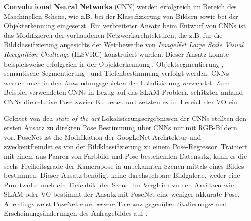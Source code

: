 \textbf{Convolutional Neural Networks} (CNN) werden erfolgreich im Bereich des Maschinellen Sehens, wie z.B. bei der Klassifizierung von Bildern \cite{krizhevskyImageNetClassificationDeep2012} sowie bei der Objekterkennung \cite{girshickRichFeatureHierarchies2014} eingesetzt. 
Ein verbreiteter Ansatz beim Entwurf von CNNs ist das Modifizieren der vorhandenen Netzwerkarchitekturen, die z.B. für die Bildklassifizierung angesichts der Wettbewerbe von \textit{ImageNet Large Scale Visual Recognition Challenge} (ILSVRC) \cite{russakovskyImageNetLargeScale2015} konstruiert wurden. Dieser Ansatz konnte beispielsweise erfolgreich in der Objekterkennung \cite{girshickFastRCNN2015a}, Objektsegmentierung \cite{kokkinosPushingBoundariesBoundary2015}, semantische Segmentierung \cite{ hazirbasFuseNetIncorporatingDepth2017} und Tiefenbestimmung \cite{boliDepthSurfaceNormal2015} verfolgt werden. CNNs werden auch in den Anwendungsgebieten der Lokalisierung verwendet. Zum Beispiel verwendeten \citet{parisottoGlobalPoseEstimation2018} CNNs in Bezug auf das SLAM Problem. \citet{melekhovRelativeCameraPose2017} schätzten anhand CNNs die relative Pose zweier Kameras. \citet{costanteExploringRepresentationLearning2016} und \citet{wangDeepVOEndtoendVisual2017} setzten es im Bereich der VO ein.

Geleitet von den \textit{state-of-the-art} Lokalisierungsergebnissen der CNNs stellten \citet{kendallPoseNetConvolutionalNetwork2015} den ersten Ansatz zu direkten Pose Bestimmung über CNNs nur mit RGB-Bildern vor. PoseNet ist die Modifikation der GoogLeNet Architektur \cite{szegedyGoingDeeperConvolutions2015} und zweckentfremdet es von der Bildklassifizierung zu einem Pose-Regressor. Trainiert mit einem aus Paaren von Farbbild und Pose bestehenden Datensatz, kann es die sechs Freiheitsgrade der Kamerapose in unbekannten Szenen mittels eines Bildes bestimmen. Dieser Ansatz benötigt keine durchsuchbare Bildgalerie, weder eine Punktwolke noch ein Tiefenbild der Szene. Im Vergleich zu den Ansätzen wie SLAM oder VO bestimmt der Ansatz mit PoseNet eine weniger akkurate Pose. Allerdings weist PoseNet eine bessere Toleranz gegenüber Skalierungs- und Erscheinungsänderungen des Anfragebildes auf \cite{piascoSurveyVisualBasedLocalization2018}.

